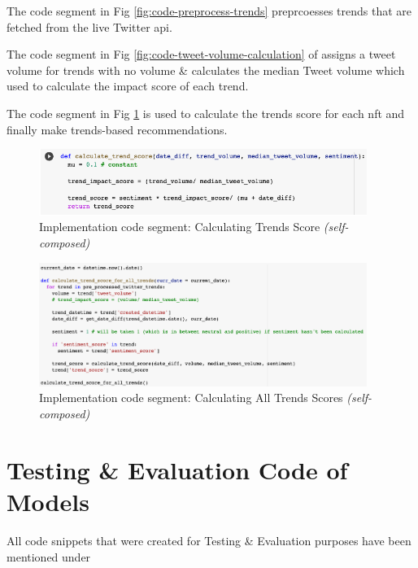 The code segment in Fig \ref{fig:code-preprocess-trends} preprcoesses trends that are fetched from the live Twitter \gls{api}.

The code segment in Fig \ref{fig:code-tweet-volume-calculation} of \textit{} assigns a tweet volume for trends with no volume \& calculates the median Tweet volume which used to calculate the impact score of each trend.

The code segment in Fig \ref{fig:code-trends-score-func} is used to calculate the trends score for each \gls{nft} and finally make trends-based recommendations.

\begin{figure}[h!]
\centering
\includegraphics[width=0.95\textwidth]{images/Implementation/code/calculate trend-score func.png}
\caption{Implementation code segment: Calculating Trends Score \textit{(self-composed)}}
\label{fig:code-trends-score-func}
\end{figure}

\begin{figure}[h!]
\centering
\includegraphics[width=0.95\textwidth]{images/Implementation/code/calculate trend-score 2.png}
\caption{Implementation code segment: Calculating All Trends Scores \textit{(self-composed)}}
\label{fig:code-trends-score}
\end{figure}


\section{Testing \& Evaluation Code of Models}
All code snippets that were created for Testing \& Evaluation purposes have been mentioned under \textit{}

